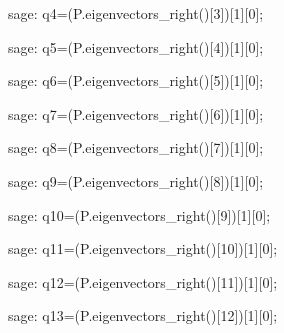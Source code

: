 \begin{sagecommandline}
    sage: q4=(P.eigenvectors_right()[3])[1][0];
\end{sagecommandline}

\begin{sagecommandline}
    sage: q5=(P.eigenvectors_right()[4])[1][0];
\end{sagecommandline}

\begin{sagecommandline}
    sage: q6=(P.eigenvectors_right()[5])[1][0];
\end{sagecommandline}

\begin{sagecommandline}
    sage: q7=(P.eigenvectors_right()[6])[1][0];
\end{sagecommandline}

\begin{sagecommandline}
    sage: q8=(P.eigenvectors_right()[7])[1][0];
\end{sagecommandline}

\begin{sagecommandline}
    sage: q9=(P.eigenvectors_right()[8])[1][0];
\end{sagecommandline}

\begin{sagecommandline}
    sage: q10=(P.eigenvectors_right()[9])[1][0];
\end{sagecommandline}

\begin{sagecommandline}
    sage: q11=(P.eigenvectors_right()[10])[1][0];
\end{sagecommandline}

\begin{sagecommandline}
    sage: q12=(P.eigenvectors_right()[11])[1][0];
\end{sagecommandline}

\begin{sagecommandline}
    sage: q13=(P.eigenvectors_right()[12])[1][0];
\end{sagecommandline}

